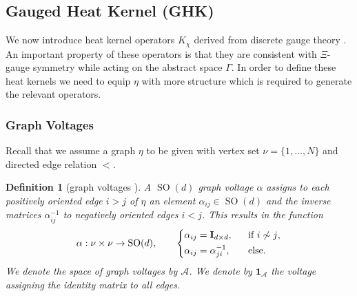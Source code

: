 \documentclass[10pt,reqno]{amsart}
\numberwithin{equation}{section}
\theoremstyle{bfnote}
\theoremstyle{bfdef}
\newtheorem{definition}[theorem]{Definition}
\newcommand{\mc}[1]{\mathcal{#1}}
\newcommand{\mbf}[1]{\mathbf{#1}}
\newcommand{\II}{\mathbf{I}_{d \times d}}
\DeclareMathOperator{\SO}{SO}
\providecommand\a; %
\renewcommand{\a}{\alpha}
\begin{document}
\subsection{Gauged Heat Kernel (GHK)}
	We now introduce heat kernel operators $K_\chi$ derived from discrete gauge theory \cite{Gattringer:2010zz,jiangGaugeTheoryGraphs2023}. An important property of these operators is that they are consistent with $\Xi$-gauge symmetry while acting on the abstract space $\Gamma$.
	In order to define these heat kernels we need to equip $\eta$ with more structure which is required to generate the relevant operators.

	\subsubsection{Graph Voltages}
		Recall that we assume a graph $\eta$ to be given with vertex set $\nu = \{1,\ldots,N\}$ and directed edge relation $<$.

		\begin{definition}[graph voltages \cite{grossTopologicalGraphTheory1987}]
			A \textit{$\SO(d)$ graph voltage $\a$} assigns to each positively oriented edge $i > j$ of $\eta$ an element $\a_{ij} \in \SO(d)$ and the inverse matrices $\a_{ij}^{-1}$ to negatively oriented edges $i < j$. This results in the function
			\begin{equation}
				\a : \nu \times \nu \to \SO(d), \qquad
				\begin{dcases}
					\a_{ij} = \II, &\text{if $i \not \sim j$,} \\
					\a_{ij} = \a_{ji}^{-1}, \quad &\text{else}.
				\end{dcases}
			\end{equation}
			We denote the space of graph voltages by $\mc{A}$. We denote by $\mbf{1}_{\mc{A}}$ the voltage assigning the identity matrix to all edges.
		\end{definition}
\end{document}
